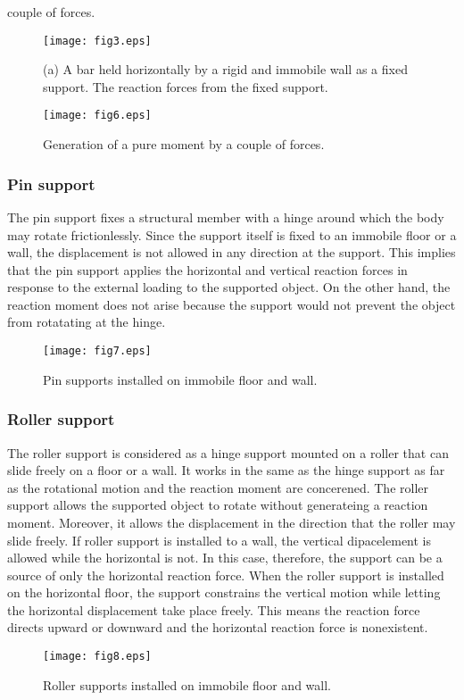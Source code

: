 \documentclass[10pt,a4j]{article}
\begin{document}
couple of forces.
\begin{figure}[h]
	\begin{center}
	\texttt{[image: fig3.eps]} 
	\end{center}
	\caption{(a) A bar held horizontally by a rigid and immobile wall as a fixed support. 
	The reaction forces from the fixed support.} 
	\label{fig:fig3}
\end{figure}
\begin{figure}[h]
	\begin{center}
	\texttt{[image: fig6.eps]} 
	\end{center}
	\caption{Generation of a pure moment by a couple of forces.} 
	\label{fig:fig6}
\end{figure}
\subsubsection{Pin support}
The pin support fixes a structural member with a hinge around which the body may 
rotate frictionlessly. Since the support itself is fixed to an immobile floor 
or a wall, the displacement is not allowed in any direction at the support. 
This implies that the pin support applies the horizontal and vertical reaction 
forces in response to the external loading to the supported object. 
On the other hand, the reaction moment does not arise because the support would 
not prevent the object from rotatating at the hinge. 
\begin{figure}[h]
	\begin{center}
	\texttt{[image: fig7.eps]} 
	\end{center}
	\caption{Pin supports installed on immobile floor and wall.} 
	\label{fig:fig7}
\end{figure}
\subsubsection{Roller support}
The roller support is considered as a hinge support mounted on a roller 
that can slide freely on a floor or a wall. 
It works in the same as the hinge support as far as the rotational motion 
 and the reaction moment are concerened. The roller support allows the supported object 
 to rotate without generateing a reaction moment. Moreover, it allows the displacement 
 in the direction that the roller may slide freely. If roller support is installed to a wall, 
 the vertical dipacelement is allowed while the horizontal is not. 
 In this case, therefore, the support can be a source of only the horizontal reaction force.
When the roller support is installed on the horizontal floor, the support 
 constrains the vertical motion while letting the horizontal displacement take place freely. 
This means the reaction force directs upward or downward and the horizontal 
reaction force is nonexistent.
\begin{figure}[h]
	\begin{center}
	\texttt{[image: fig8.eps]} 
	\end{center}
	\caption{Roller supports installed on immobile floor and wall.} 
	\label{fig:fig8}
\end{figure}
\end{document}
